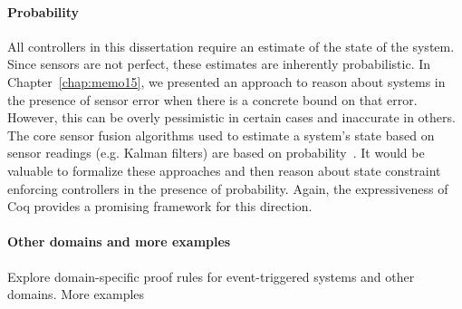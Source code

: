 \paragraph{Probability}
All controllers in this dissertation require an estimate of the state of
the system. Since sensors are not perfect, these estimates are inherently
probabilistic. In Chapter~\ref{chap:memo15}, we presented an approach to
reason about systems in the presence of sensor error when there is a
concrete bound on that error. However, this can be overly pessimistic in
certain cases and inaccurate in others. The core sensor fusion algorithms
used to estimate a system's state based on sensor readings (e.g. Kalman
filters) are based on probability~\cite{Simon06estimation}. It would be
valuable to formalize these approaches and then reason about state
constraint enforcing controllers in the presence of probability. Again, the
expressiveness of Coq provides a promising framework for this direction.

\paragraph{Other domains and more examples}
Explore domain-specific proof rules for event-triggered systems and other domains.
More examples
